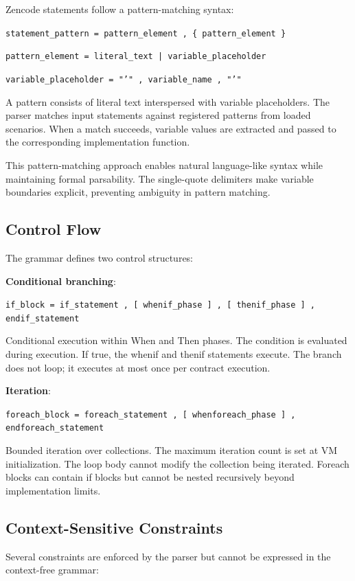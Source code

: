 Zencode statements follow a pattern-matching syntax:

\texttt{statement\_pattern = pattern\_element , \{ pattern\_element
  \}}

\texttt{pattern\_element = literal\_text | variable\_placeholder}

\texttt{variable\_placeholder = "'" , variable\_name , "'"}

A pattern consists of literal text interspersed with variable
placeholders. The parser matches input statements against registered
patterns from loaded scenarios. When a match succeeds, variable values
are extracted and passed to the corresponding implementation function.

This pattern-matching approach enables natural language-like syntax
while maintaining formal parsability. The single-quote delimiters make
variable boundaries explicit, preventing ambiguity in pattern
matching.

\subsection{Control Flow}

The grammar defines two control structures:

\textbf{Conditional branching}:

\texttt{if\_block = if\_statement , [ whenif\_phase ] , [
    thenif\_phase ] , endif\_statement}

Conditional execution within When and Then phases. The condition is
evaluated during execution. If true, the whenif and thenif statements
execute. The branch does not loop; it executes at most once per
contract execution.

\textbf{Iteration}:

\texttt{foreach\_block = foreach\_statement , [ whenforeach\_phase ] ,
  endforeach\_statement}

Bounded iteration over collections. The maximum iteration count is set
at VM initialization. The loop body cannot modify the collection being
iterated. Foreach blocks can contain if blocks but cannot be nested
recursively beyond implementation limits.

\subsection{Context-Sensitive Constraints}

Several constraints are enforced by the parser but cannot be expressed
in the context-free grammar:

